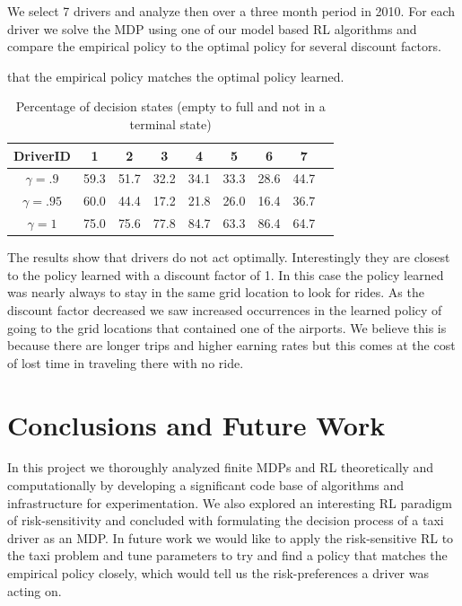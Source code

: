 \documentclass{article}
\begin{document}
We select 7 drivers and analyze then over a three month period in 2010. For each driver we solve the MDP using one of our model based RL algorithms and  compare the empirical policy to the optimal policy for several discount factors.
\vspace{-2mm}
\begin{table}[H]
\centering
\caption{Percentage of decision states (empty to full and not in a terminal state)} that the empirical policy matches the optimal policy learned.
\label{my-label}
\begin{tabular}{|c|c|c|c|c|c|c|c|c|}
\hline
DriverID & 1 & 2 & 3 & 4 & 5 & 6 & 7 \\
\hline
$\gamma = .9$ & 59.3 & 51.7 & 32.2 & 34.1 & 33.3 & 28.6 & 44.7 \\
$\gamma = .95$ & 60.0 & 44.4 & 17.2 & 21.8 & 26.0 & 16.4 & 36.7 \\
$\gamma = 1$ & 75.0 & 75.6 & 77.8 & 84.7 & 63.3 & 86.4 & 64.7 \\
\hline
\end{tabular}
\end{table}
\vspace{-2mm}
The results show that drivers do not act optimally. Interestingly they are closest to the policy learned with a discount factor of 1. In this case the policy learned was nearly always to stay in the same grid location to look for rides. As the discount factor decreased we saw increased occurrences in the learned policy of going to the grid locations that contained one of the airports. We believe this is because there are longer trips and higher earning rates but this comes at the cost of lost time in traveling there with no ride.
\section{Conclusions and Future Work}
In this project we thoroughly analyzed finite MDPs and RL theoretically and computationally by developing a significant code base of algorithms and infrastructure for experimentation. We also explored an interesting RL paradigm of risk-sensitivity and concluded with formulating the decision process of a taxi driver as an MDP. In future work we would like to apply the risk-sensitive RL to the taxi problem and tune parameters to try and find a policy that matches the empirical policy closely, which would tell us the risk-preferences a driver was acting on.



\end{document}
